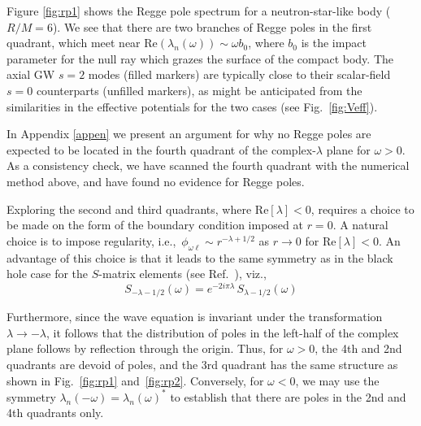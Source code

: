 \documentclass[aps,prd,longbibliography,reprint,twocolumn,amsmath,amssymb,amsfonts,showpacs,footnote,superscriptaddress]{revtex4-1}%
\begin{document}
Figure \ref{fig:rp1} shows the Regge pole spectrum for a neutron-star-like body ($R/M = 6$). We see that there are two branches of Regge poles in the first quadrant, which meet near $\text{Re}( \lambda_n(\omega) ) \sim \omega b_0$, where $b_0$ is the impact parameter for the null ray which grazes the surface of the compact body. The axial GW $s=2$ modes (filled markers) are typically close to their scalar-field $s=0$ counterparts (unfilled markers), as might be anticipated from the similarities in the effective potentials for the two cases (see Fig.~\ref{fig:Veff}).

In Appendix \ref{appen} we present an argument for why no Regge poles are expected to be located in the fourth quadrant of the complex-$\lambda$ plane for $\omega>0$. As a consistency check, 
we have scanned the fourth quadrant with the numerical method above, and have found no evidence for Regge poles. 

Exploring the second and third quadrants, where $\text{Re}[{\lambda}] < 0$, requires a choice to be made on the form of the boundary condition imposed at $r=0$. A natural choice is to impose regularity, i.e.,~$\phi_{\omega\ell} \sim r^{-\lambda+1/2}$ as $r \rightarrow 0$ for $\text{Re} [\lambda] < 0$. An advantage of this choice is that it leads to the same symmetry as in the black hole case for the $S$-matrix elements (see Ref.~\cite{Andersson:1994rk,Folacci:2019cmc}), viz.,
\begin{equation}\label{Matrix_S_CAM_symm}
S_{-\lambda -1/2}(\omega) =  e^{-2i \pi \lambda} \, S_{\lambda -1/2}(\omega)
\end{equation}

Furthermore, since the wave equation is invariant under the transformation $\lambda \rightarrow -\lambda$, it follows that the distribution of poles in the left-half of the complex plane follows by reflection through the origin. Thus, for $\omega > 0$, the 4th and 2nd quadrants are devoid of poles, and the 3rd quadrant has the same structure as shown in Fig.~\ref{fig:rp1} and~\ref{fig:rp2}.
Conversely, for $\omega < 0$, we may use the symmetry $\lambda_n(-\omega) = \lambda_n(\omega)^*$ to establish that there are poles in the 2nd and 4th quadrants only.
\end{document}
